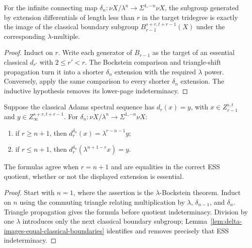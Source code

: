 \begin{lemma}
  \label{lem:delta-images-equal-classical-boundaries}
  \notready
  For the infinite connecting map
  $\delta_n:\nu X/\lambda^n\to\Sigma^{1,-n}\nu X$, the subgroup generated by
  extension differentials of length less than $r$ in the target tridegree is
  exactly the image of the classical boundary subgroup
  $B_{r-1}^{s+r,t+r-1}(X)$ under the corresponding $\lambda$-multiple.
\end{lemma}

\begin{proof}
  Induct on $r$.  Write each generator of $B_{r-1}$ as the target of an
  essential classical $d_{r'}$ with $2\le r'<r$.  The Bockstein comparison and
  triangle-shift propagation turn it into a shorter $\delta_n$ extension with
  the required $\lambda$ power.  Conversely, apply the same comparison to
  every shorter $\delta_n$ extension.  The inductive hypothesis removes its
  lower-page indeterminacy.
\end{proof}

\begin{proposition}
  \label{prop:delta-ess-formula-infinite}
  \notready
  Suppose the classical Adams spectral sequence has
  $d_r(x)=y$, with $x\in Z_{r-1}^{s,t}$ and
  $y\in Z_\infty^{s+r,t+r-1}$.  For
  $\delta_n:\nu X/\lambda^n\to\Sigma^{1,-n}\nu X$:
  \begin{enumerate}
    \item if $r\ge n+1$, then
      $d_r^{\delta_n}(x)=\lambda^{r-n-1}y$;
    \item if $r\le n+1$, then
      $d_r^{\delta_n}(\lambda^{n+1-r}x)=y$.
  \end{enumerate}
  The formulas agree when $r=n+1$ and are equalities in the correct ESS
  quotient, whether or not the displayed extension is essential.
\end{proposition}

\begin{proof}
  Start with $n=1$, where the assertion is the $\lambda$-Bockstein theorem.
  Induct on $n$ using the commuting triangle relating multiplication by
  $\lambda$, $\delta_{n-1}$, and $\delta_n$.  Triangle propagation gives the
  formula before quotient indeterminacy.  Division by one $\lambda$ introduces
  only the next classical boundary subgroup; Lemma~\ref{lem:delta-images-equal-classical-boundaries}
  identifies and removes precisely that ESS indeterminacy.
\end{proof}

